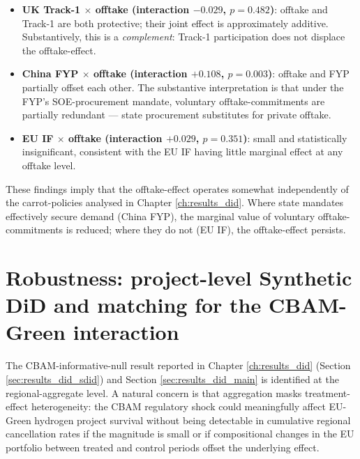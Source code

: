 \begin{itemize}[leftmargin=2em]
\item \textbf{UK Track-1 $\times$ offtake (interaction $-0.029$, $p = 0.482$)}: offtake and Track-1 are both protective; their joint effect is approximately additive. Substantively, this is a \emph{complement}: Track-1 participation does not displace the offtake-effect.

\item \textbf{China FYP $\times$ offtake (interaction $+0.108$, $p = 0.003$)}: offtake and FYP partially offset each other. The substantive interpretation is that under the FYP's SOE-procurement mandate, voluntary offtake-commitments are partially redundant --- state procurement substitutes for private offtake.

\item \textbf{EU IF $\times$ offtake (interaction $+0.029$, $p = 0.351$)}: small and statistically insignificant, consistent with the EU IF having little marginal effect at any offtake level.
\end{itemize}

These findings imply that the offtake-effect operates somewhat independently of the carrot-policies analysed in Chapter \ref{ch:results_did}. Where state mandates effectively secure demand (China FYP), the marginal value of voluntary offtake-commitments is reduced; where they do not (EU IF), the offtake-effect persists.

\section{Robustness: project-level Synthetic DiD and matching for the CBAM-Green interaction}
\label{sec:offtake_project_sdid}

The CBAM-informative-null result reported in Chapter \ref{ch:results_did} (Section \ref{sec:results_did_sdid}) and Section \ref{sec:results_did_main} is identified at the regional-aggregate level. A natural concern is that aggregation masks treatment-effect heterogeneity: the CBAM regulatory shock could meaningfully affect EU-Green hydrogen project survival without being detectable in cumulative regional cancellation rates if the magnitude is small or if compositional changes in the EU portfolio between treated and control periods offset the underlying effect.

